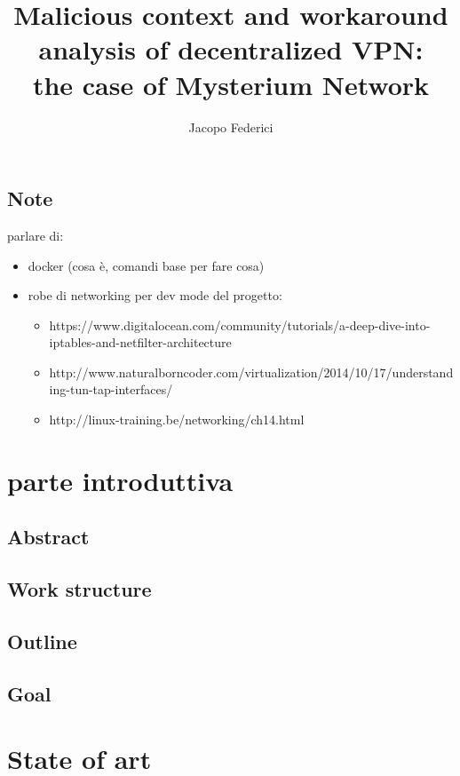 \documentclass[]{article}
\title{Malicious context and workaround analysis of decentralized VPN:\\the case of Mysterium Network}
\author{Jacopo Federici}
\begin{document}
	\maketitle	
	\clearpage
	
	\tableofcontents{}

	\subsection{Note}
	parlare di:
	\begin{itemize}
		\item docker (cosa è, comandi base per fare cosa)
		\item robe di networking per dev mode del progetto:
		\begin{itemize}
			\item https://www.digitalocean.com/community/tutorials/a-deep-dive-into-iptables-and-netfilter-architecture
			\item http://www.naturalborncoder.com/virtualization/2014/10/17/understanding-tun-tap-interfaces/
			\item http://linux-training.be/networking/ch14.html
		\end{itemize}
	\end{itemize}
	\section{parte introduttiva}
		
	\subsection{Abstract}
	\subsection{Work structure}
	\subsection{Outline}
	\subsection{Goal}
	
	
	\section{State of art}
\end{document}
